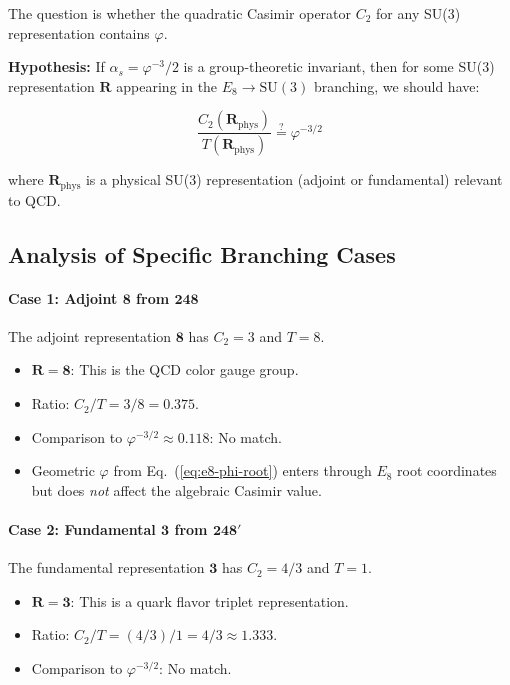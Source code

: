 \documentclass{article}
\begin{document}
\begin{table}[h]
The question is whether the quadratic Casimir operator $C_2$ for any SU(3) representation contains $\varphi$.

\textbf{Hypothesis:} If $\alpha_s = \varphi^{-3}/2$ is a group-theoretic invariant, then for some SU(3) representation $\mathbf{R}$ appearing in the $E_8 \to \text{SU}(3)$ branching, we should have:

\begin{equation}
  \frac{C_2(\mathbf{R}_\text{phys})}{T(\mathbf{R}_\text{phys})} \stackrel{?}{=} \varphi^{-3/2}
  \label{eq:hypothesis}
\end{equation}

where $\mathbf{R}_\text{phys}$ is a physical SU(3) representation (adjoint or fundamental) relevant to QCD.

\subsection{Analysis of Specific Branching Cases}

\paragraph{Case 1: Adjoint $\mathbf{8}$ from $\mathbf{248}$}

The adjoint representation $\mathbf{8}$ has $C_2 = 3$ and $T = 8$.

\begin{itemize}
  \item $\mathbf{R} = \mathbf{8}$: This is the QCD color gauge group.
  \item Ratio: $C_2/T = 3/8 = 0.375$.
  \item Comparison to $\varphi^{-3/2} \approx 0.118$: No match.
  \item Geometric $\varphi$ from Eq.~(\ref{eq:e8-phi-root}) enters through $E_8$ root coordinates but does \emph{not} affect the algebraic Casimir value.
\end{itemize}

\paragraph{Case 2: Fundamental $\mathbf{3}$ from $\mathbf{248}'$}

The fundamental representation $\mathbf{3}$ has $C_2 = 4/3$ and $T = 1$.

\begin{itemize}
  \item $\mathbf{R} = \mathbf{3}$: This is a quark flavor triplet representation.
  \item Ratio: $C_2/T = (4/3)/1 = 4/3 \approx 1.333$.
  \item Comparison to $\varphi^{-3/2}$: No match.
\end{itemize}


\end{table}
\end{document}
